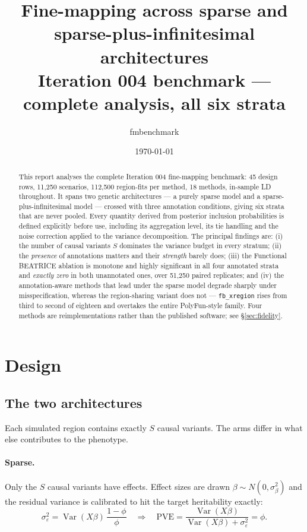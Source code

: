 \documentclass[11pt,a4paper]{article}
\title{\bf Fine-mapping across sparse and sparse-plus-infinitesimal architectures\\[3pt]
\large Iteration 004 benchmark --- complete analysis, all six strata}
\author{fmbenchmark}\date{\today}
\begin{document}
\maketitle

\begin{abstract}\noindent
This report analyses the complete Iteration 004 fine-mapping benchmark: 45 design
rows, 11{,}250 scenarios, 112{,}500 region-fits per method, 18 methods, in-sample
LD throughout. It spans two genetic architectures --- a purely sparse model and a
sparse-plus-infinitesimal model --- crossed with three annotation conditions,
giving six strata that are never pooled. Every quantity derived from posterior
inclusion probabilities is defined explicitly before use, including its
aggregation level, its tie handling and the noise correction applied to the
variance decomposition. The principal findings are: (i) the number of causal
variants $S$ dominates the variance budget in every stratum; (ii) the
\emph{presence} of annotations matters and their \emph{strength} barely does;
(iii) the Functional BEATRICE ablation is monotone and highly significant in all
four annotated strata and \emph{exactly zero} in both unannotated ones, over
51{,}250 paired replicates; and (iv) the annotation-aware methods that lead under
the sparse model degrade sharply under misspecification, whereas the
region-sharing variant does not --- \texttt{fb\_xregion} rises from third to
second of eighteen and overtakes the entire PolyFun-style family.
Four methods are reimplementations rather than the published software; see
\S\ref{sec:fidelity}.
\end{abstract}

\tableofcontents\bigskip

\section{Design}\label{sec:design}

\subsection{The two architectures}

Each simulated region contains exactly $S$ causal variants. The arms differ in
what else contributes to the phenotype.

\paragraph{Sparse.} Only the $S$ causal variants have effects. Effect sizes are
drawn $\beta\sim N(0,\sigma^2_\beta)$ and the residual variance is calibrated to
hit the target heritability exactly:
\[
\sigma^2_\varepsilon=\operatorname{Var}(X\beta)\,\frac{1-\phi}{\phi}
\quad\Longrightarrow\quad
\mathrm{PVE}=\frac{\operatorname{Var}(X\beta)}{\operatorname{Var}(X\beta)+\sigma^2_\varepsilon}=\phi .
\]
\end{document}
